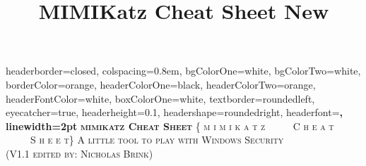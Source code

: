 \documentclass[landscape,a0paper,fontscale=0.285]{baposter} %
\title{MIMIKatz Cheat Sheet New}
\begin{document}
\begin{poster}
{
headerborder=closed, %
colspacing=0.8em, %
bgColorOne=white, %
bgColorTwo=white, %
borderColor=orange, %
headerColorOne=black, %
headerColorTwo=orange, %
headerFontColor=white, %
boxColorOne=white, %
textborder=roundedleft, %
eyecatcher=true, %
headerheight=0.1\textheight, %
headershape=roundedright, %
headerfont=\Large\bf\textsc, %
linewidth=2pt %
}
{\bf\textsc{mimikatz Cheat Sheet}\vspace{0.5em}} %
{\textsc{\{ m i m i k a t z \ \ \ \ \ C h e a t \ \ \ \ \ S h e e t\} \hspace{12pt}}}
{\textsc{A little tool to play with Windows Security \\ (V1.1 edited by: Nicholas Brink) \hspace{12pt}}} 

\end{poster}
\end{document}
